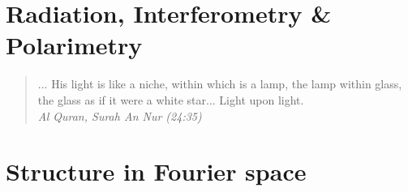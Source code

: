\documentclass[12pt,twoside,openany]{book}
\newcommand{\singlespaced}{\renewcommand{\baselinestretch}{1}\normalfont}
\newcommand{\halfspaced}{\renewcommand{\baselinestretch}{1.5}\normalfont}
\begin{document}
\vspace*{\fill}

\newpage

\singlespaced
\tableofcontents


\newpage
{}
{}
\listoftables

\newpage
{}
\listoffigures


\halfspaced
\setlength{\parindent}{0.25in}



\mainmatter
\part{Radiation, Interferometry \& Polarimetry}

\vspace*{\fill} 
\begin{quote} 
\centering 
... His light is like a niche, within which is a lamp, the lamp within glass, the glass as if it were a white star... Light upon light.\\
\textit{Al Quran, Surah An Nur (24:35)}
\end{quote}
\vspace*{\fill}

%
%
%
%
%

%
%
%

%
%
\part{Structure in Fourier space}
\end{document}
